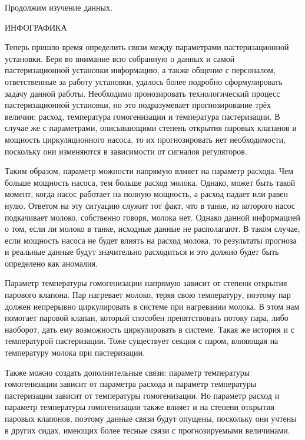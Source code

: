 {  \par \redline Продолжим изучение данных.

  ИНФОГРАФИКА


  \par \redline Теперь пришло время определить связи между параметрами пастеризационной установки. Беря во внимание всю собранную о данных и самой пастеризационной установки информацию, а также общение с персоналом, ответственные за работу установки, удалось более подробно сформулировать задачу данной работы. Необходимо пронозировать технологический процесс пастеризационной установки, но это подразумевает прогнозирование трёх величин: расход, температура гомогенизации и температура пастеризации. В случае же с параметрами, описывающими степень открытия паровых клапанов и мощность циркуляционного насоса, то их прогнозировать нет необходимости, поскольку они изменяются в зависимости от сигналов регуляторов. 

  \par \redline Таким образом, параметр можности напрямую влияет на параметр расхода. Чем больше мощность насоса, тем больше расход молока. Однако, может быть такой момент, когда насос работает на полную мощность, а расход падает или равен нулю. Ответом на эту ситуацию служит тот факт, что в танке, из которого насос подкачивает молоко, собственно говоря, молока нет. Однако данной информацией о том, если ли молоко в танке, исходные данные не располагают. В таком случае, если мощность насоса не будет влиять на расход молока, то результаты прогноза и реальные данные будут значительно расходиться и это должно будет быть определено как аномалия. 
  
  \par \redline Параметр температуры гомогенизации напрямую зависит от степени открытия парового клапона. Пар нагревает молоко, теряя свою температуру, поэтому пар должен непрерывно циркулировать в системе при нагревании молока. В этом нам помогает паровой клапан, который способен препятствовать потоку пара, либо наоборот, дать ему возможность циркулировать в системе. Такая же история и с температурой пастеризации. Тоже существует секция с паром, влияющая на температуру молока при пастеризации. 
  
  \par \redline Также можно создать дополнительные связи: параметр температуры гомогенизации зависит от параметра расхода и параметр температуры пастеризации зависит от температуры гомогенизации. Но параметр расход и параметр температуры гомогенизации также влияет и на степени открытия паровых клапонов, поэтому данные связи будут опущены, поскольку они учтены в других сидах, имеющих более тесные связи с прогнозируемыми величинами.    
  
  

  \par 
}


